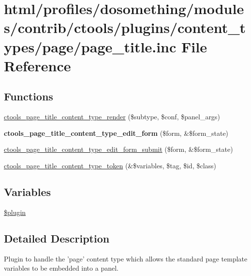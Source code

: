 \hypertarget{page__title_8inc}{
\section{html/profiles/dosomething/modules/contrib/ctools/plugins/content\_\-types/page/page\_\-title.inc File Reference}
\label{page__title_8inc}
}
\subsection*{Functions}
\begin{DoxyCompactItemize}
\item 
\hyperlink{page__title_8inc_acaa253005e6582abb1efa33d16d459c7}{ctools\_\-page\_\-title\_\-content\_\-type\_\-render} (\$subtype, \$conf, \$panel\_\-args)
\item 
\hypertarget{page__title_8inc_a5a877e64e80d1f3d92e63f35e99adae4}{
{\bfseries ctools\_\-page\_\-title\_\-content\_\-type\_\-edit\_\-form} (\$form, \&\$form\_\-state)}
\label{page__title_8inc_a5a877e64e80d1f3d92e63f35e99adae4}

\item 
\hyperlink{page__title_8inc_a85666e0116e4aef569a498dd6c3fafad}{ctools\_\-page\_\-title\_\-content\_\-type\_\-edit\_\-form\_\-submit} (\$form, \&\$form\_\-state)
\item 
\hyperlink{page__title_8inc_a277e72debf66e71329b1f9960854822a}{ctools\_\-page\_\-title\_\-content\_\-type\_\-token} (\&\$variables, \$tag, \$id, \$class)
\end{DoxyCompactItemize}
\subsection*{Variables}
\begin{DoxyCompactItemize}
\item 
\hyperlink{page__title_8inc_ada8a7130088351710bb02ed622d6bf65}{\$plugin}
\end{DoxyCompactItemize}


\subsection{Detailed Description}
Plugin to handle the 'page' content type which allows the standard page template variables to be embedded into a panel. 

